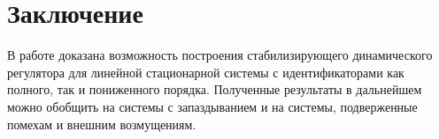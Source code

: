 \documentclass[a4paper,14pt]{article}
\theoremstyle{definition}
\begin{document}
\section{Заключение}

В работе доказана возможность построения стабилизирующего динамического регулятора для линейной стационарной системы
с идентификаторами как полного, так и пониженного порядка. Полученные результаты в дальнейшем можно обобщить
на системы с запаздыванием и на системы, подверженные помехам и внешним возмущениям.

\newpage

\renewcommand{\refname}{Список использованных источников}
\begin{center}
  \nocite{Kalman2004}
  \nocite{Polyak2019}
  \printbibliography{}
\end{center}




\end{document}
